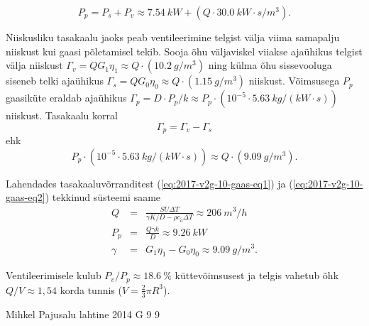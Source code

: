 \documentclass[11pt]{article}
\begin{document}
{{\begin{equation}
P_{p}=P_{s}+P_{v}\approx\SI{7.54}{kW}+\left(Q\cdot\SI{30.0}{kW\cdot s/m^{3}}\right).\label{eq:2017-v2g-10-gaas-eq1}
\end{equation}


Niiskusliku tasakaalu jaoks peab ventileerimine telgist välja viima
samapalju niiskust kui gaasi põletamisel tekib. Sooja õhu väljaviskel
viiakse ajaühikus telgist välja niiskust $\Gamma_{v}=QG_{1}\eta_{1}\approx Q\cdot\left(\SI{10.2}{g/m^{3}}\right)$
ning külma õhu sissevooluga siseneb telki ajaühikus $\Gamma_{s}=QG_{0}\eta_{0}\approx Q\cdot\left(\SI{1.15}{g/m^{3}}\right)$
niiskust. Võimsusega $P_{p}$ gaasiküte eraldab ajaühikus
$\Gamma_{p}=D\cdot P_{p}/k\approx P_{p}\cdot\left(10^{-5}\cdot\SI{5.63}{kg/\left(kW\cdot s\right)}\right)$
niiskust. Tasakaalu korral
\vspace{-3pt}
\[
\Gamma_{p}=\Gamma_{v}-\Gamma_{s}
\]
\vspace{-3pt}
\noindent ehk
\vspace{-3pt}
\begin{equation}
P_{p}\cdot\left(10^{-5}\cdot\SI{5.63}{kg/\left(kW\cdot s\right)}\right)\approx Q\cdot\left(\SI{9.09}{g/m^{3}}\right).\label{eq:2017-v2g-10-gaas-eq2}
\end{equation}


Lahendades tasakaaluvõrranditest (\ref{eq:2017-v2g-10-gaas-eq1}) ja (\ref{eq:2017-v2g-10-gaas-eq2})
tekkinud süsteemi saame
\vspace{-3pt}
\begin{eqnarray*}
	Q & = & \frac{SU\Delta T}{\gamma K/D-\rho c_{\tilde{o}}\Delta T}\approx\SI{206}{m^{3}/h}\\
	P_{p} & = & \frac{Q\gamma k}{D}\approx\SI{9.26}{kW}\\
	\gamma & = & G_{1}\eta_{1}-G_{0}\eta_{0}\approx\SI{9.09}{g/m^{3}}.
\end{eqnarray*}


Ventileerimisele kulub $P_{v}/P_{p}\approx\SI{18.6}{\percent}$ küttevõimsusest
ja telgis vahetub õhk $Q/V\approx1,54$ korda tunnis ($V=\frac{2}{3}\pi R^{3}$).
\fi
}

{Mihkel Pajusalu} %
{lahtine} %
{2014} %
{G 9} %
{9} %
{

}}
\end{document}
